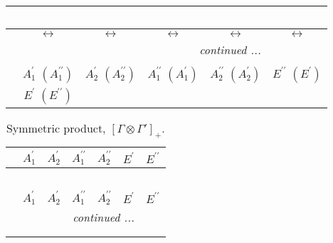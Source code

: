 \documentclass[fleqn,10pt,landscape]{article}
\begin{document}
\begin{itemize}
\begin{center}
\begin{longtable}{cccccc}
\multicolumn{5}{l}{\tablename\ \thetable{}} \\
 \hline \hline
 & $\leftrightarrow$ & $\leftrightarrow$ & $\leftrightarrow$ & $\leftrightarrow$ & $\leftrightarrow$ \\ \hline \endhead

 \hline \hline
\multicolumn{5}{r}{\footnotesize\it continued ...} \\ \endfoot

 \hline \hline
\multicolumn{5}{r}{} \\ \endlastfoot

 & $ A_{1}^{\prime}\,\,(A_{1}^{\prime\prime}) $ & $ A_{2}^{\prime}\,\,(A_{2}^{\prime\prime}) $ & $ A_{1}^{\prime\prime}\,\,(A_{1}^{\prime}) $ & $ A_{2}^{\prime\prime}\,\,(A_{2}^{\prime}) $ & $ E^{\prime\prime}\,\,(E^{\prime}) $ \\
& $ E^{\prime}\,\,(E^{\prime\prime}) $ & $  $ & $  $ & $  $ & $  $ \\
\end{longtable}
\end{center}
\begin{center}
\renewcommand{\arraystretch}{1.0}
\begin{longtable}{c|cccccc}
\caption{Symmetric product, $[\Gamma\otimes\Gamma']_+.$}
 \\
 \hline \hline
 & $ A_{1}^{\prime} $ & $ A_{2}^{\prime} $ & $ A_{1}^{\prime\prime} $ & $ A_{2}^{\prime\prime} $ & $ E^{\prime} $ & $ E^{\prime\prime} $ \\ \hline \endfirsthead

\multicolumn{6}{l}{\tablename\ \thetable{}} \\
 \hline \hline
 & $ A_{1}^{\prime} $ & $ A_{2}^{\prime} $ & $ A_{1}^{\prime\prime} $ & $ A_{2}^{\prime\prime} $ & $ E^{\prime} $ & $ E^{\prime\prime} $ \\ \hline \endhead

 \hline \hline
\multicolumn{6}{r}{\footnotesize\it continued ...} \\ \endfoot

 \hline \hline
\multicolumn{6}{r}{} \\ \endlastfoot


\end{longtable}
\end{center}
\end{itemize}
\end{document}
